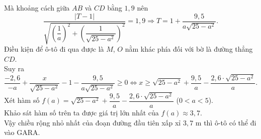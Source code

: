 \begin{ex}
{Mà khoảng cách giữa $AB$ và $CD$ bằng $1{,}9$ nên
$$
\dfrac{|T-1|}{\sqrt{\left(\dfrac{1}{a}\right)^2+\left(\dfrac{1}{\sqrt{25-a^2}}\right)^2}}=1,9 \Rightarrow T=1+\dfrac{9,5}{a \sqrt{25-a^2}} .
$$
Điều kiện để ô-tô đi qua được là $M$, $O$ nằm khác phía đối với bờ là đường thẳng $CD$.\\
Suy ra
$$
\dfrac{-2,6}{-a}+\dfrac{x}{\sqrt{25-a^2}}-1-\dfrac{9,5}{a \sqrt{25-a^2}} \geq 0 \Leftrightarrow x \geq \sqrt{25-a^2}+\dfrac{9,5}{a}-\dfrac{2,6 \cdot \sqrt{25-a^2}}{a}.
$$
Xét hàm số $f(a)=\sqrt{25-a^2}+\dfrac{9,5}{a}-\dfrac{2,6 \cdot \sqrt{25-a^2}}{a}$ ($0<a<5$).\\
Khảo sát hàm số trên ta được giá trị lớn nhất của $f(a) \approx 3{,}7$.\\
Vậy chiều rộng nhỏ nhất của đoạn đường đầu tiên xấp xỉ $3{,}7$ m thì ô-tô có thể đi vào GARA.
	}
\end{ex}

